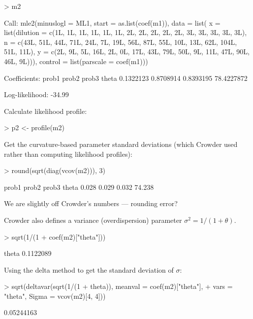 \documentclass{article}
\begin{document}
\begin{Schunk}
\begin{Sinput}
> m2
\end{Sinput}
\begin{Soutput}
Call:
mle2(minuslogl = ML1, start = as.list(coef(m1)), data = list(
    x = list(dilution = c(1L, 1L, 1L, 1L, 1L, 1L, 2L, 2L, 2L, 
    2L, 2L, 3L, 3L, 3L, 3L, 3L), n = c(43L, 51L, 44L, 71L, 24L, 
    7L, 19L, 56L, 87L, 55L, 10L, 13L, 62L, 104L, 51L, 11L), y = c(2L, 
    9L, 5L, 16L, 2L, 0L, 17L, 43L, 79L, 50L, 9L, 11L, 47L, 90L, 
    46L, 9L))), control = list(parscale = coef(m1)))

Coefficients:
     prob1      prob2      prob3      theta 
 0.1322123  0.8708914  0.8393195 78.4227872 

Log-likelihood: -34.99 
\end{Soutput}
\end{Schunk}

Calculate likelihood profile:
\begin{Schunk}
\begin{Sinput}
> p2 <- profile(m2)
\end{Sinput}
\end{Schunk}

Get the curvature-based parameter standard
deviations (which Crowder used
rather than computing likelihood profiles):
\begin{Schunk}
\begin{Sinput}
> round(sqrt(diag(vcov(m2))), 3)
\end{Sinput}
\begin{Soutput}
 prob1  prob2  prob3  theta 
 0.028  0.029  0.032 74.238 
\end{Soutput}
\end{Schunk}
We are slightly off Crowder's numbers --- rounding
error?

Crowder also defines a variance (overdispersion) parameter
$\sigma^2=1/(1+\theta)$.
\begin{Schunk}
\begin{Sinput}
> sqrt(1/(1 + coef(m2)["theta"]))
\end{Sinput}
\begin{Soutput}
    theta 
0.1122089 
\end{Soutput}
\end{Schunk}

Using the delta method to get the standard deviation of
$\sigma$:
\begin{Schunk}
\begin{Sinput}
> sqrt(deltavar(sqrt(1/(1 + theta)), meanval = coef(m2)["theta"], 
+     vars = "theta", Sigma = vcov(m2)[4, 4]))
\end{Sinput}
\begin{Soutput}
[1] 0.05244163
\end{Soutput}
\end{Schunk}
\end{document}
